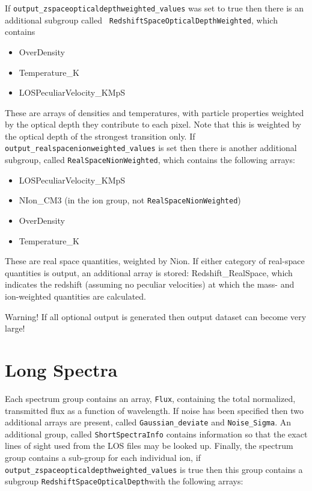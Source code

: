 \documentclass{report}
\begin{document}
If {\tt output\_zspaceopticaldepthweighted\_values} was set to true
then there is an additional subgroup called {\tt
  RedshiftSpaceOpticalDepthWeighted}, which contains

\begin{itemize}
\item OverDensity
\item Temperature\_K
\item LOSPeculiarVelocity\_KMpS
\end{itemize}

These are arrays of densities and temperatures, with particle properties weighted by the optical depth they contribute to each pixel. Note that this is weighted by the optical depth of the strongest transition only. If {\tt output\_realspacenionweighted\_values} is set then there is another additional subgroup, called {\tt RealSpaceNionWeighted}, which contains the following arrays:

\begin{itemize}
\item LOSPeculiarVelocity\_KMpS
\item NIon\_CM3 (in the ion group, not {\tt RealSpaceNionWeighted})
\item OverDensity
\item Temperature\_K
\end{itemize}

These are real space quantities, weighted by Nion.  If either category of real-space quantities is output, an additional array is stored: Redshift\_RealSpace, which indicates the redshift (assuming no peculiar velocities) at which the mass- and ion-weighted quantities are calculated.

Warning!  If all optional output is generated then output dataset can become very large!

\section{Long Spectra}

Each spectrum group contains an array, {\tt Flux}, containing the total normalized, transmitted flux as a function of wavelength.  If noise has been specified then two additional arrays are present, called {\tt Gaussian\_deviate} and {\tt Noise\_Sigma}.  An additional group, called {\tt ShortSpectraInfo} contains information so that the exact lines of sight used from the LOS files may be looked up.  Finally, the spectrum group contains a sub-group for each individual ion, if {\tt output\_zspaceopticaldepthweighted\_values} is true then this group contains a subgroup {\tt RedshiftSpaceOpticalDepth}with the following arrays:
\end{document}
